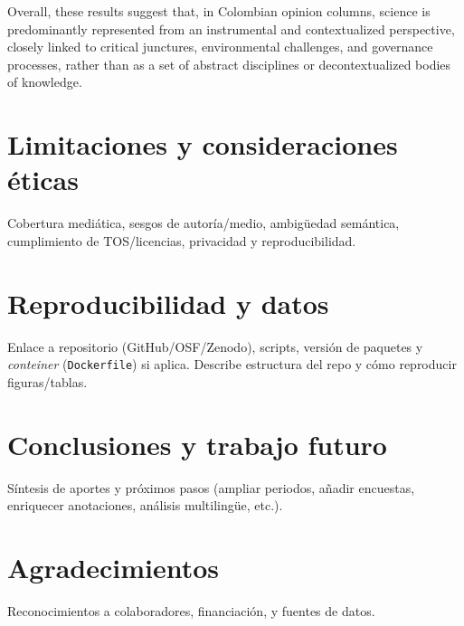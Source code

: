 \documentclass[11pt,a4paper]{article}
\begin{document}
Overall, these results suggest that, in Colombian opinion columns, science is predominantly represented from an instrumental and contextualized perspective, closely linked to critical junctures, environmental challenges, and governance processes, rather than as a set of abstract disciplines or decontextualized bodies of knowledge.

	
	
	\section{Limitaciones y consideraciones éticas}
	Cobertura mediática, sesgos de autoría/medio, ambigüedad semántica, cumplimiento de TOS/licencias, privacidad y reproducibilidad.
	
	\section{Reproducibilidad y datos}
	Enlace a repositorio (GitHub/OSF/Zenodo), scripts, versión de paquetes y \emph{conteiner} (\texttt{Dockerfile}) si aplica. 
	Describe estructura del repo y cómo reproducir figuras/tablas.
	
	\section{Conclusiones y trabajo futuro}
	Síntesis de aportes y próximos pasos (ampliar periodos, añadir encuestas, enriquecer anotaciones, análisis multilingüe, etc.).
	
	\section*{Agradecimientos}
	Reconocimientos a colaboradores, financiación, y fuentes de datos.
	
	

	
	
	\appendix

	
\end{document}
